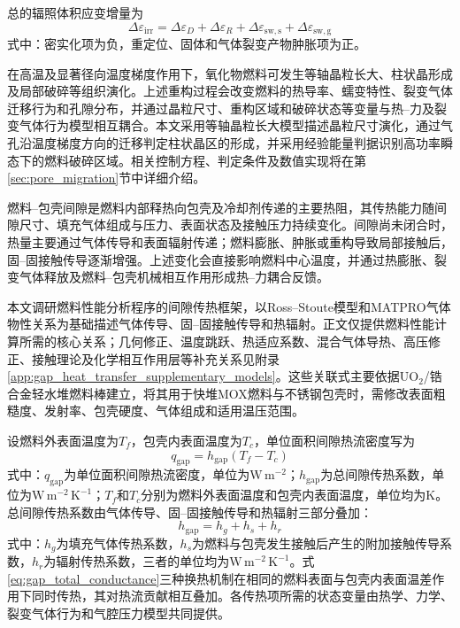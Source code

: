 总的辐照体积应变增量为
\begin{equation}
	\Delta\varepsilon_{\mathrm{irr}}
	=\Delta\varepsilon_D
	+\Delta\varepsilon_R
	+\Delta\varepsilon_{\mathrm{sw,s}}
	+\Delta\varepsilon_{\mathrm{sw,g}}
	\label{eq:mox_total_irradiation_volumetric_strain}
\end{equation}
式中：密实化项为负，重定位、固体和气体裂变产物肿胀项为正。


在高温及显著径向温度梯度作用下，氧化物燃料可发生等轴晶粒长大、柱状晶形成及局部破碎等组织演化。上述重构过程会改变燃料的热导率、蠕变特性、裂变气体迁移行为和孔隙分布，并通过晶粒尺寸、重构区域和破碎状态等变量与热--力及裂变气体行为模型相互耦合。本文采用等轴晶粒长大模型描述晶粒尺寸演化，通过气孔沿温度梯度方向的迁移判定柱状晶区的形成，并采用经验能量判据识别高功率瞬态下的燃料破碎区域。相关控制方程、判定条件及数值实现将在第\ref{sec:pore_migration}节中详细介绍。

\label{sec:gap_heat_transfer_model}

燃料--包壳间隙是燃料内部释热向包壳及冷却剂传递的主要热阻，其传热能力随间隙尺寸、填充气体组成与压力、表面状态及接触压力持续变化。间隙尚未闭合时，热量主要通过气体传导和表面辐射传递；燃料膨胀、肿胀或重构导致局部接触后，固--固接触传导逐渐增强。上述变化会直接影响燃料中心温度，并通过热膨胀、裂变气体释放及燃料--包壳机械相互作用形成热--力耦合反馈。

本文调研燃料性能分析程序的间隙传热框架，以Ross--Stoute模型和MATPRO气体物性关系为基础描述气体传导、固--固接触传导和热辐射\cite{halesBISONTheoryManual2016,rossHEATTRANSFERCOEFFICIENT1962,hagrmanSCDAPRELAP5MOD1995}。正文仅提供燃料性能计算所需的核心关系；几何修正、温度跳跃、热适应系数、混合气体导热、高压修正、接触理论及化学相互作用层等补充关系见附录\ref{app:gap_heat_transfer_supplementary_models}。这些关联式主要依据$\mathrm{UO}_2$/锆合金轻水堆燃料棒建立，将其用于快堆MOX燃料与不锈钢包壳时，需修改表面粗糙度、发射率、包壳硬度、气体组成和适用温压范围。


设燃料外表面温度为$T_f$，包壳内表面温度为$T_c$，单位面积间隙热流密度写为
\begin{equation}
	q_{\mathrm{gap}}
	=h_{\mathrm{gap}}\left(T_f-T_c\right)
	\label{eq:gap_heat_flux}
\end{equation}
式中：$q_{\mathrm{gap}}$为单位面积间隙热流密度，单位为$\mathrm{W\,m^{-2}}$；$h_{\mathrm{gap}}$为总间隙传热系数，单位为$\mathrm{W\,m^{-2}\,K^{-1}}$；$T_f$和$T_c$分别为燃料外表面温度和包壳内表面温度，单位均为$\mathrm{K}$。总间隙传热系数由气体传导、固--固接触传导和热辐射三部分叠加：
\begin{equation}
	h_{\mathrm{gap}}=h_g+h_s+h_r
	\label{eq:gap_total_conductance}
\end{equation}
式中：$h_g$为填充气体传热系数，$h_s$为燃料与包壳发生接触后产生的附加接触传导系数，$h_r$为辐射传热系数，三者的单位均为$\mathrm{W\,m^{-2}\,K^{-1}}$。式\eqref{eq:gap_total_conductance}三种换热机制在相同的燃料表面与包壳内表面温差作用下同时传热，其对热流贡献相互叠加。各传热项所需的状态变量由热学、力学、裂变气体行为和气腔压力模型共同提供。

